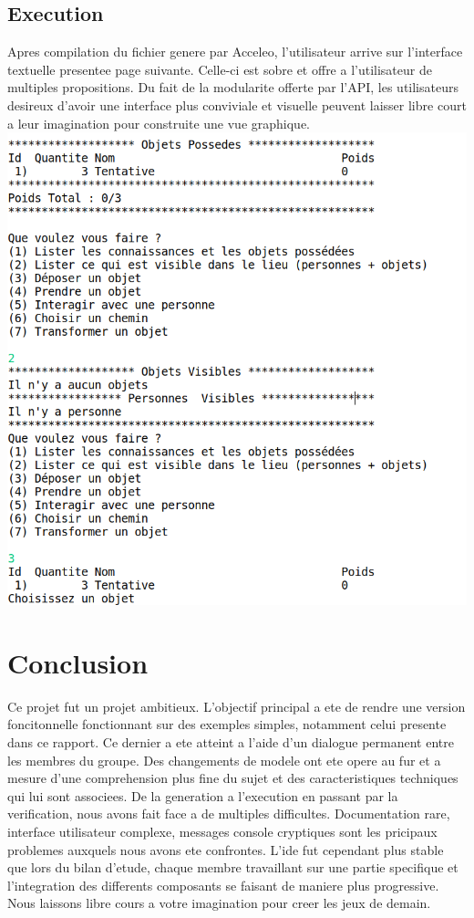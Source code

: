 \documentclass[12pt]{article}
\begin{document}
\subsection{Execution}
Apres compilation du fichier genere par Acceleo, l'utilisateur arrive sur l'interface textuelle presentee page suivante. Celle-ci est sobre et offre a l'utilisateur de multiples propositions. Du fait de la modularite offerte par l'API, les utilisateurs desireux d'avoir une interface plus conviviale et visuelle peuvent laisser libre court a leur imagination pour construite une vue graphique.
\newline\newline
\includegraphics[width=\textwidth]{images/explorateur}
\newline\newline

\newpage
\section*{Conclusion}
Ce projet fut un projet ambitieux. L'objectif principal a ete de rendre une version foncitonnelle fonctionnant sur des exemples simples, notamment celui presente dans ce rapport. Ce dernier a ete atteint a l'aide d'un dialogue permanent entre les membres du groupe. Des changements de modele ont ete opere au fur et a mesure d'une comprehension plus fine du sujet et des caracteristiques techniques qui lui sont associees.\newline
De la generation a l'execution en passant par la verification, nous avons fait face a de multiples difficultes. Documentation rare, interface utilisateur complexe, messages console cryptiques sont les pricipaux problemes auxquels nous avons ete confrontes. L'ide fut cependant plus stable que lors du bilan d'etude, chaque membre travaillant sur une partie specifique et l'integration des differents composants se faisant de maniere plus progressive.\newline
Nous laissons libre cours a votre imagination pour creer les jeux de demain.
\end{document}
